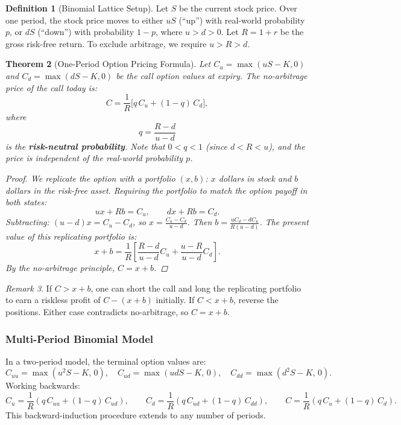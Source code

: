 \documentclass[12pt, a4paper]{article}
\theoremstyle{plain}
\newtheorem{theorem}{Theorem}[section]
\theoremstyle{definition}
\newtheorem{definition}[theorem]{Definition}
\theoremstyle{remark}
\newtheorem{remark}[theorem]{Remark}
\begin{document}
\begin{definition}[Binomial Lattice Setup]
  Let $S$ be the current stock price. Over one period, the stock price moves to either $uS$ (``up'') with real-world probability $p$, or $dS$ (``down'') with probability $1-p$, where $u > d > 0$. Let $R = 1 + r$ be the gross risk-free return. To exclude arbitrage, we require $u > R > d$.
\end{definition}

\begin{theorem}[One-Period Option Pricing Formula]
  Let $C_u = \max(uS - K, 0)$ and $C_d = \max(dS - K, 0)$ be the call option values at expiry. The no-arbitrage price of the call today is:
  \[
    C = \frac{1}{R}\bigl[q\,C_u + (1-q)\,C_d\bigr],
  \]
  where
  \[
    q = \frac{R - d}{u - d}
  \]
  is the \textbf{risk-neutral probability}. Note that $0 < q < 1$ (since $d < R < u$), and the price is independent of the real-world probability $p$.
  \begin{proof}
    We replicate the option with a portfolio $(x, b)$: $x$ dollars in stock and $b$ dollars in the risk-free asset. Requiring the portfolio to match the option payoff in both states:
    \[
      ux + Rb = C_u, \qquad dx + Rb = C_d.
    \]
    Subtracting: $(u-d)x = C_u - C_d$, so $x = \frac{C_u - C_d}{u-d}$. Then $b = \frac{uC_d - dC_u}{R(u-d)}$. The present value of this replicating portfolio is:
    \[
      x + b = \frac{1}{R}\!\left[\frac{R-d}{u-d}C_u + \frac{u-R}{u-d}C_d\right].
    \]
    By the no-arbitrage principle, $C = x + b$.
  \end{proof}
\end{theorem}

\begin{remark}
  If $C > x + b$, one can short the call and long the replicating portfolio to earn a riskless profit of $C - (x+b)$ initially. If $C < x+b$, reverse the positions. Either case contradicts no-arbitrage, so $C = x + b$.
\end{remark}

\subsubsection{Multi-Period Binomial Model}

In a two-period model, the terminal option values are:
\[
  C_{uu} = \max(u^2 S - K,\, 0), \quad C_{ud} = \max(udS - K,\, 0), \quad C_{dd} = \max(d^2 S - K,\, 0).
\]
Working backwards:
\[
  C_u = \frac{1}{R}(q\,C_{uu} + (1-q)\,C_{ud}), \qquad
  C_d = \frac{1}{R}(q\,C_{ud} + (1-q)\,C_{dd}), \qquad
  C = \frac{1}{R}(q\,C_u + (1-q)\,C_d).
\]
This backward-induction procedure extends to any number of periods.
\end{document}
